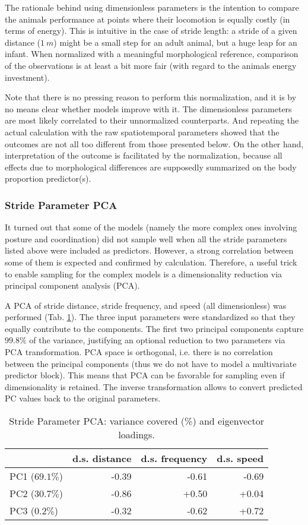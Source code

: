 The rationale behind using dimensionless parameters is the intention to compare the animals performance at points where their locomotion is equally costly (in terms of energy).
This is intuitive in the case of stride length: a stride of a given distance (\(1\ m\)) might be a small step for an adult animal, but a huge leap for an infant.
When normalized with a meaningful morphological reference, comparison of the observations is at least a bit more fair (with regard to the animals energy investment).

Note that there is no pressing reason to perform this normalization, and it is by no means clear whether models improve with it.
The dimensionless parameters are most likely correlated to their unnormalized counterparts.
And repeating the actual calculation with the raw spatiotemporal parameters showed that the outcomes are not all too different from those presented below.
On the other hand, interpretation of the outcome is facilitated by the normalization, because all effects due to morphological differences are supposedly summarized on the body proportion predictor(s).


\subsubsection{Stride Parameter PCA}
\label{prep:stridepca}
It turned out that some of the models (namely the more complex ones involving posture and coordination) did not sample well when all the stride parameters listed above were included as predictors.
However, a strong correlation between some of them is expected and confirmed by calculation.
Therefore, a useful trick to enable sampling for the complex models is a dimensionality reduction via principal component analysis (PCA).

A PCA of stride distance, stride frequency, and speed (all dimensionless) was performed (Tab. \ref{tab:stridepca}).
The three input parameters were standardized so that they equally contribute to the components.
The first two principal components capture \(99.8 \%\) of the variance, justifying an optional reduction to two parameters via PCA transformation.
PCA space is orthogonal, i.e. there is no correlation between the principal components (thus we do not have to model a multivariate predictor block).
This means that PCA can be favorable for sampling even if dimensionality is retained.
The inverse transformation allows to convert predicted PC values back to the original parameters.
\bigskip

\begin{table}[p]
\caption{\label{tab:stridepca}Stride Parameter PCA: variance covered (\%) and eigenvector loadings.}
\centering
\begin{tabular}{lrrr}
 & d.s. distance & d.s. frequency & d.s. speed\\[0pt]
\hline
PC1 (\(69.1 \%\)) & -0.39 & -0.61 & -0.69\\[0pt]
PC2 (\(30.7 \%\)) & -0.86 & +0.50 & +0.04\\[0pt]
PC3 (\(0.2 \%\)) & -0.32 & -0.62 & +0.72\\[0pt]
\end{tabular}
\end{table}

